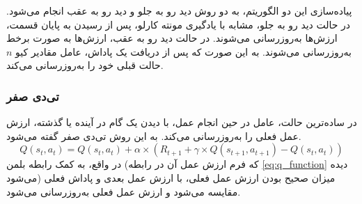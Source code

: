 پیاده‌سازی این دو الگوریتم، به دو روش دید رو به جلو و دید رو به عقب انجام می‌شود.
در حالت دید رو به جلو، مشابه با یادگیری مونته کارلو، پس از رسیدن به پایان قسمت، ارزش‌ها به‌روز‌رسانی می‌شوند.
در حالت دید رو به عقب، ارزش‌ها به صورت برخط به‌روز‌رسانی می‌شوند. به این صورت که پس از دریافت یک پاداش، عامل مقادیر کیو $n$ حالت‌ قبلی خود را به‌روز‌رسانی می‌کند.
\subsubsection{تی‌دی صفر}
در ساده‌ترین حالت، عامل در حین انجام عمل، با دیدن یک گام در آینده یا گذشته، ارزش عمل فعلی را به‌روز‌رسانی می‌کند.
به این روش تی‌دی صفر گفته می‌شود.
\begin{equation}\label{eq:td_zero_q_function}
    Q(s_t, a_t) = Q(s_t, a_t) + \alpha \times (R_{t+1} + \gamma \times Q(s_{t+1}, a_{t+1}) - Q(s_t, a_t))
\end{equation}
در واقع، به کمک رابطه بلمن
(که فرم ارزش عمل آن در رابطه  \ref{eq:q_function} دیده می‌شود)
میزان صحیح بودن ارزش عمل فعلی، با ارزش عمل بعدی و پاداش فعلی مقایسه می‌شود و ارزش عمل فعلی به‌روز‌رسانی می‌شود.
